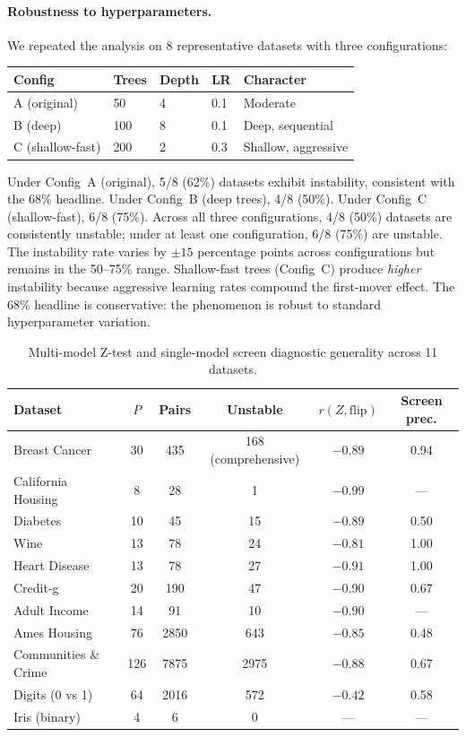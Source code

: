 \documentclass{article}
\begin{document}
\paragraph{Robustness to hyperparameters.}
We repeated the analysis on 8 representative datasets with three configurations:

\begin{center}
\small
\begin{tabular}{@{}lllll@{}}
\toprule
Config & Trees & Depth & LR & Character \\
\midrule
A (original) & 50 & 4 & 0.1 & Moderate \\
B (deep) & 100 & 8 & 0.1 & Deep, sequential \\
C (shallow-fast) & 200 & 2 & 0.3 & Shallow, aggressive \\
\bottomrule
\end{tabular}
\end{center}

Under Config~A (original), 5/8 (62\%) datasets exhibit instability, consistent with the 68\% headline. Under Config~B (deep trees), 4/8 (50\%). Under Config~C (shallow-fast), 6/8 (75\%). Across all three configurations, 4/8 (50\%) datasets are consistently unstable; under at least one configuration, 6/8 (75\%) are unstable. The instability rate varies by $\pm 15$ percentage points across configurations but remains in the 50--75\% range. Shallow-fast trees (Config~C) produce \emph{higher} instability because aggressive learning rates compound the first-mover effect. The 68\% headline is conservative: the phenomenon is robust to standard hyperparameter variation.

\begin{table}[t]
\centering
\caption{Multi-model Z-test and single-model screen diagnostic generality across 11 datasets.}
\label{tab:f1-generality}
\small
\begin{tabular}{@{}lccccc@{}}
\toprule
Dataset & $P$ & Pairs & Unstable & $r(Z, \text{flip})$ & Screen prec. \\
\midrule
Breast Cancer & 30 & 435 & 168 (comprehensive) & $-0.89$ & 0.94 \\
California Housing & 8 & 28 & 1 & $-0.99$ & --- \\
Diabetes & 10 & 45 & 15 & $-0.89$ & 0.50 \\
Wine & 13 & 78 & 24 & $-0.81$ & 1.00 \\
Heart Disease & 13 & 78 & 27 & $-0.91$ & 1.00 \\
Credit-g & 20 & 190 & 47 & $-0.90$ & 0.67 \\
Adult Income & 14 & 91 & 10 & $-0.90$ & --- \\
Ames Housing & 76 & 2850 & 643 & $-0.85$ & 0.48 \\
Communities \& Crime & 126 & 7875 & 2975 & $-0.88$ & 0.67 \\
Digits (0 vs 1) & 64 & 2016 & 572 & $-0.42$ & 0.58 \\
Iris (binary) & 4 & 6 & 0 & --- & --- \\
\bottomrule
\end{tabular}
\end{table}
\end{document}
